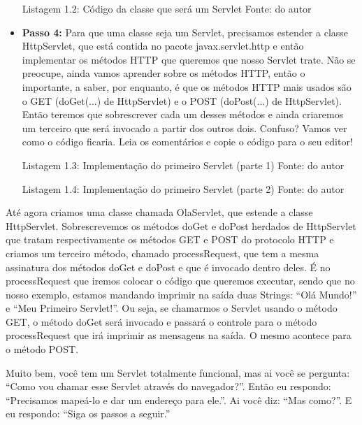 \begin{itemize}
    Listagem 1.2: Código da classe que será um Servlet
    Fonte: do autor
    
    \item \textbf{Passo 4:} Para que uma classe seja um Servlet, precisamos estender a classe HttpServlet, que está contida no pacote javax.servlet.http e então implementar os métodos HTTP que queremos que nosso Servlet trate. Não se preocupe, ainda vamos aprender sobre os métodos HTTP, então o importante, a saber, por enquanto, é que os métodos HTTP mais usados são o GET (doGet(...) de HttpServlet) e o POST (doPost(...) de HttpServlet). Então teremos que sobrescrever cada um desses métodos e ainda criaremos um terceiro que será invocado a partir dos outros dois. Confuso? Vamos ver como o código ficaria. Leia os comentários e copie o código para o seu editor!
    
    Listagem 1.3: Implementação do primeiro Servlet (parte 1)
    Fonte: do autor
    
    Listagem 1.4: Implementação do primeiro Servlet (parte 2)
    Fonte: do autor
    
\end{itemize}

Até agora criamos uma classe chamada OlaServlet, que estende a classe HttpServlet. Sobrescrevemos os métodos doGet e doPost herdados de HttpServlet que tratam respectivamente os métodos GET e POST do protocolo HTTP e criamos um terceiro método, chamado processRequest, que tem a mesma assinatura dos métodos doGet e doPost e que é invocado dentro deles. É no processRequest que iremos colocar o código que queremos executar, sendo que no nosso exemplo, estamos mandando imprimir na saída duas Strings: ``Olá Mundo!'' e ``Meu Primeiro Servlet!''. Ou seja, se chamarmos o Servlet usando o método GET, o método doGet será invocado e passará o controle para o método processRequest que irá imprimir as mensagens na saída. O mesmo acontece para o método POST.

Muito bem, você tem um Servlet totalmente funcional, mas ai você se pergunta: ``Como vou chamar esse Servlet através do navegador?''. Então eu respondo: ``Precisamos mapeá-lo e dar um endereço para ele.''. Ai você diz: ``Mas como?''. E eu respondo: ``Siga os passos a seguir.''

